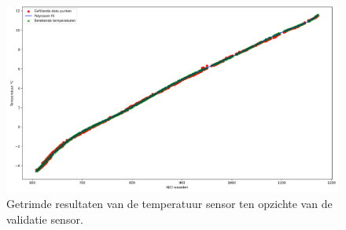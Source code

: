 \begin{figure}[H]
    \centering
    \includegraphics[width=0.75\linewidth]{pictures/trim_resultaten_temp_sensor.png}
    \caption{Getrimde resultaten van de temperatuur sensor ten opzichte van de validatie sensor. }
    \label{fig:trim_resulaten_temp_sensor}
\end{figure}